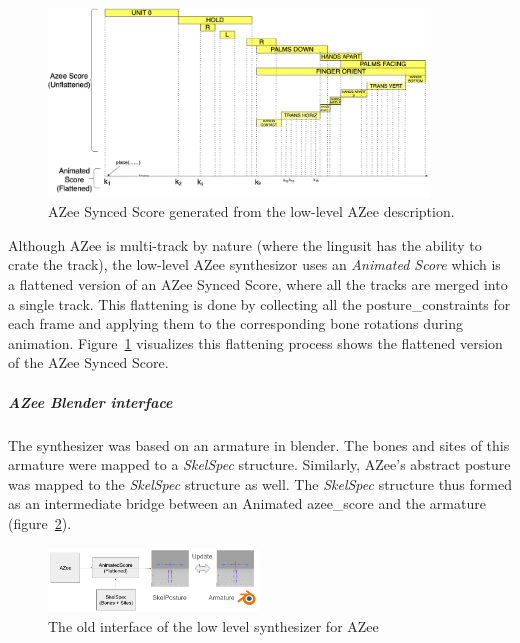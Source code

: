 \documentclass[../../main.tex]{subfiles}
\begin{document}
\begin{figure}[h]
  \centering
  \includegraphics[width=0.9\textwidth]{chapters/background_work/images/azee_score_armoire_combined.png}
  \caption{AZee Synced Score generated from the low-level AZee description.}
  \label{fig:azee_score_armoire_combined}
\end{figure}

Although AZee is multi-track by nature (where the lingusit has the ability to crate the track), the low-level AZee synthesizor uses an \emph{Animated Score} which is a flattened version of an AZee Synced Score, where all the tracks are merged into a single track. This flattening is done by collecting all the \gls{posture_constraint}s for each frame and applying them to the corresponding bone rotations during animation. Figure~\ref{fig:azee_score_armoire_combined} visualizes this flattening process shows the flattened version of the AZee Synced Score.

\subparagraph{AZee Blender interface}
\label{ch:background_work:sign_language_synthesis:3d_techniques:sign_language_synthesis_systems:azee_based:low_level_synthesizer_for_azee:azee_blender_interface}

The synthesizer was based on an armature in blender. The bones and sites of this armature were mapped to a \emph{SkelSpec} structure. Similarly, AZee's abstract posture was mapped to the \emph{SkelSpec} structure as well. The \emph{SkelSpec} structure thus formed as an intermediate bridge between an Animated \gls{azee_score} and the armature (figure~\ref{fig:old_interface}). 

\begin{figure}
    \centering
    \includegraphics[width=0.5\textwidth]{chapters/background_work/images/old_interface.png}
    \caption{The old interface of the low level synthesizer for AZee}
    \label{fig:old_interface}
\end{figure}
\end{document}
